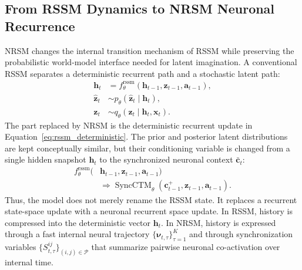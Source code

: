 \documentclass{article}
\begin{document}
\subsection{From RSSM Dynamics to NRSM Neuronal Recurrence}

NRSM changes the internal transition mechanism of RSSM while preserving the probabilistic world-model interface needed for latent imagination. A conventional RSSM separates a deterministic recurrent path and a stochastic latent path:
\begin{align}
\mathbf h_t
&=
f_{\theta}^{\mathrm{rssm}}
(\mathbf h_{t-1},\mathbf z_{t-1},\mathbf a_{t-1}),
\label{eq:rssm_deterministic}\\
\hat{\mathbf z}_t
&\sim
p_{\theta}(\hat{\mathbf z}_t\mid\mathbf h_t),\\
\mathbf z_t
&\sim
q_{\theta}(\mathbf z_t\mid\mathbf h_t,\mathbf x_t).
\label{eq:rssm_latent}
\end{align}
The part replaced by NRSM is the deterministic recurrent update in Equation~\eqref{eq:rssm_deterministic}. The prior and posterior latent distributions are kept conceptually similar, but their conditioning variable is changed from a single hidden snapshot $\mathbf h_t$ to the synchronized neuronal context $\bar{\mathbf c}_t$:
\begin{equation}
\begin{aligned}
f_{\theta}^{\mathrm{rssm}}
(&\mathbf h_{t-1},\mathbf z_{t-1},\mathbf a_{t-1})\\
&\Longrightarrow
\operatorname{SyncCTM}_{\theta}
(\mathbf c^+_{t-1},\mathbf z_{t-1},\mathbf a_{t-1}).
\end{aligned}
\label{eq:rssm_to_nrsm}
\end{equation}
Thus, the model does not merely rename the RSSM state. It replaces a recurrent state-space update with a neuronal recurrent space update. In RSSM, history is compressed into the deterministic vector $\mathbf h_t$. In NRSM, history is expressed through a fast internal neural trajectory $\{\boldsymbol{\nu}_{t,\tau}\}_{\tau=1}^{K}$ and through synchronization variables $\{S^{ij}_{t,\tau}\}_{(i,j)\in\mathcal P}$ that summarize pairwise neuronal co-activation over internal time.
\end{document}
